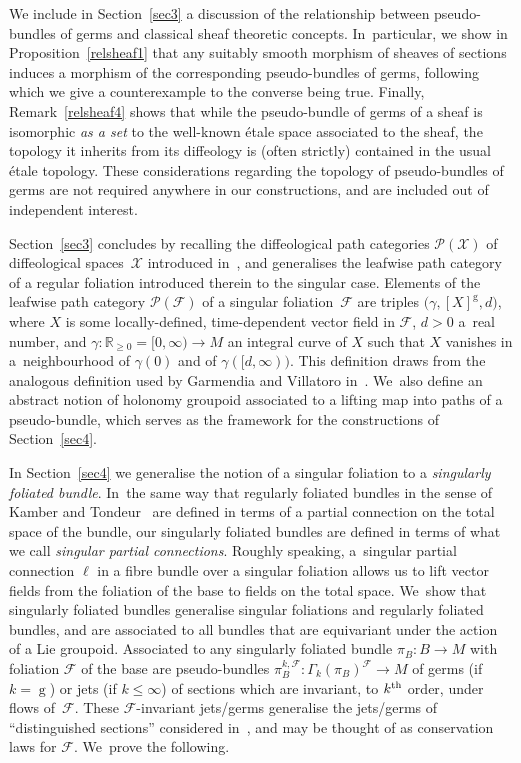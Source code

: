 \documentclass[10pt,a4paper]{amsart}
\numberwithin{equation}{section}
\def\g{\operatorname{g}}
\def\FF{{\mathcal{F}}}
\def\PP{{\mathcal{P}}}
\def\XX{{\mathcal{X}}}
\def\RB{{\mathbb{R}}}
\begin{document}
We include in Section~\ref{sec3} a discussion of the relationship between pseudo-bundles of germs and classical sheaf theoretic concepts. In~particular, we show in Proposition~\ref{relsheaf1} that any sui\-t\-ably smooth morphism of sheaves of sections induces a morphism of the corresponding pseudo-bundles of germs, following which we give a counterexample to the converse being true. Finally, Remark~\ref{relsheaf4} shows that while the pseudo-bundle of germs of a sheaf is isomorphic \textit{as a set} to the well-known \'{e}tale space associated to the sheaf, the topology it inherits from its diffeology is (often strictly) contained in the usual \'{e}tale topology. These considerations regarding the topology of pseudo-bundles of germs are not required anywhere in our constructions, and are included out of independent interest.

Section~\ref{sec3} concludes by recalling the diffeological path categories $\PP(\XX)$ of diffeological spa\-ces~$\XX$ introduced in~\cite{mac3}, and generalises the leafwise path category of a regular foliation introduced therein to the singular case. Elements of the leafwise path category $\PP(\FF)$ of a singular foliation~$\FF$ are triples $\big(\gamma,[X]^{\g},d\big)$, where $X$ is some locally-defined, time-dependent vector field in $\FF$, $d>0$ a~real number, and $\gamma\colon \RB_{\geq0} = [0,\infty)\rightarrow M$ an integral curve of $X$ such that $X$ vanishes in a~neigh\-bour\-hood of $\gamma(0)$ and of $\gamma([d,\infty))$. This definition draws from the analogous definition used by Garmendia and Villatoro in~\cite{VilGar1}. We~also define an abstract notion of holonomy groupoid associated to a lifting map into paths of a pseudo-bundle, which serves as the framework for the constructions of Section~\ref{sec4}.

In Section~\ref{sec4} we generalise the notion of a singular foliation to a \textit{singularly foliated bundle}. In~the same way that regularly foliated bundles in the sense of Kamber and Tondeur~\cite{folbund} are defined in terms of a partial connection on the total space of the bundle, our singularly foliated bundles are defined in terms of what we call \textit{singular partial connections}. Roughly speaking, a~singular partial connection $\ell$ in a fibre bundle over a singular foliation allows us to lift vector fields from the foliation of the base to fields on the total space. We~show that singularly foliated bundles generalise singular foliations and regularly foliated bundles, and are associated to all bundles that are equivariant under the action of a Lie groupoid. Associated to any singularly foliated bundle $\pi_{B}\colon B\rightarrow M$ with foliation $\FF$ of the base are pseudo-bundles $\pi_{B}^{k,\FF}\colon \Gamma_{k}(\pi_{B})^{\FF}\rightarrow M$ of germs (if~$k=\g$) or jets (if $k\leq\infty$) of sections which are invariant, to $k^{\rm th}$ order, under flows of~$\FF$. These $\FF$-invariant jets/germs generalise the jets/germs of ``distinguished sections'' considered in~\cite{mac3}, and may be thought of as conservation laws for $\FF$. We~prove the following.
\end{document}
